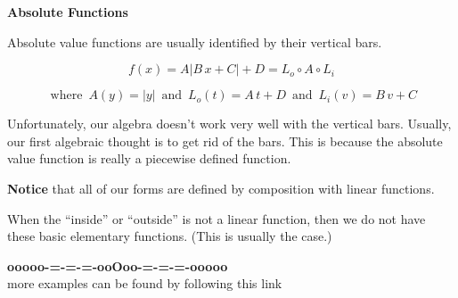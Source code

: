 \documentclass{ximera}
\begin{document}
\begin{template}  \textbf{\textcolor{blue!55!black}{Absolute Functions}} 



Absolute value functions are usually identified by their vertical bars.





\[ f(x) = A | B \, x + C | + D = L_o \circ A \circ L_i\]

\[
\text{ where } \,  A(y) = | y |  \,  \text{ and } \,    L_o(t) = A \, t + D    \,  \text{ and } \,   L_i(v) = B \, v + C
\]







\end{template}






Unfortunately, our algebra doesn't work very well with the vertical bars.  Usually, our first algebraic thought is to get rid of the bars.  This is because the absolute value function is really a piecewise defined function.   



\textbf{Notice} that all of our forms are defined by composition with linear functions.  

When the ``inside'' or ``outside'' is not a linear function, then we do not have these basic elementary functions. (This is usually the case.)


























\begin{center}
\textbf{\textcolor{green!50!black}{ooooo-=-=-=-ooOoo-=-=-=-ooooo}} \\

more examples can be found by following this link\\ 

\end{center}
\end{document}
